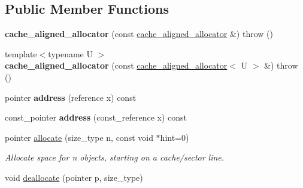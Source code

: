 \subsection*{Public Member Functions}
\begin{DoxyCompactItemize}
\item 
\hypertarget{classtbb_1_1cache__aligned__allocator_a11b1921251262137671599e99fbe8d4e}{}{\bfseries cache\+\_\+aligned\+\_\+allocator} (const \hyperlink{classtbb_1_1cache__aligned__allocator}{cache\+\_\+aligned\+\_\+allocator} \&)  throw ()\label{classtbb_1_1cache__aligned__allocator_a11b1921251262137671599e99fbe8d4e}

\item 
\hypertarget{classtbb_1_1cache__aligned__allocator_ab5a78cc56dcc0851117b3c88bb3af16a}{}{\footnotesize template$<$typename U $>$ }\\{\bfseries cache\+\_\+aligned\+\_\+allocator} (const \hyperlink{classtbb_1_1cache__aligned__allocator}{cache\+\_\+aligned\+\_\+allocator}$<$ U $>$ \&)  throw ()\label{classtbb_1_1cache__aligned__allocator_ab5a78cc56dcc0851117b3c88bb3af16a}

\item 
\hypertarget{classtbb_1_1cache__aligned__allocator_a39aa68042abff22210f801eab98f6dfa}{}pointer {\bfseries address} (reference x) const \label{classtbb_1_1cache__aligned__allocator_a39aa68042abff22210f801eab98f6dfa}

\item 
\hypertarget{classtbb_1_1cache__aligned__allocator_a5bd8fe0e5de894404c8b868b37a0fe53}{}const\+\_\+pointer {\bfseries address} (const\+\_\+reference x) const \label{classtbb_1_1cache__aligned__allocator_a5bd8fe0e5de894404c8b868b37a0fe53}

\item 
\hypertarget{classtbb_1_1cache__aligned__allocator_a99d05096f80877849cb31d80247e0f85}{}pointer \hyperlink{classtbb_1_1cache__aligned__allocator_a99d05096f80877849cb31d80247e0f85}{allocate} (size\+\_\+type n, const void $\ast$hint=0)\label{classtbb_1_1cache__aligned__allocator_a99d05096f80877849cb31d80247e0f85}

\begin{DoxyCompactList}\small\item\em Allocate space for n objects, starting on a cache/sector line. \end{DoxyCompactList}\item 
\hypertarget{classtbb_1_1cache__aligned__allocator_a7f7310e046c4b6b8618864de8e27a471}{}void \hyperlink{classtbb_1_1cache__aligned__allocator_a7f7310e046c4b6b8618864de8e27a471}{deallocate} (pointer p, size\+\_\+type)\label{classtbb_1_1cache__aligned__allocator_a7f7310e046c4b6b8618864de8e27a471}


\end{DoxyCompactItemize}
